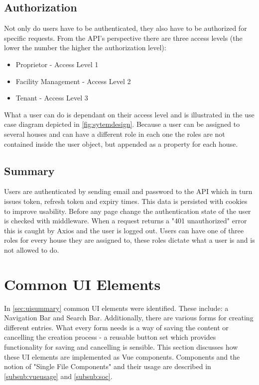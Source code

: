 \subsection{Authorization}
Not only do users have to be authenticated, they also have to be authorized for specific requests. From the API's perspective there are three access levels (the lower the number the higher the authorization level): 

\begin{itemize}
  \item Proprietor - Access Level 1
  \item Facility Management - Access Level 2
  \item Tenant - Access Level 3
\end{itemize}

What a user can do is dependant on their access level and is illustrated in the use case diagram depicted in \autoref{fig:sytemdesign}.
Because a user can be assigned to several houses and can have a different role in each one the roles are not contained inside the user object, but appended as a property for each house.

\subsection{Summary}
Users are authenticated by sending email and password to the API which in turn issues token, refresh token and expiry times. This data is persisted with cookies to improve usability. Before any page change the authentication state of the user is checked with middleware. When a request returns a "401 unauthorized" error this is caught by Axios and the user is logged out. Users can have one of three roles for every house they are assigned to, these roles dictate what a user is and is not allowed to do.

\section{Common UI Elements}
In \autoref{sec:uisummary} common UI elements were identified. These include: a Navigation Bar and Search Bar. Additionally, there are various forms for creating different entries. What every form needs is a way of saving the content or cancelling the creation process - a reusable button set which provides functionality for saving and cancelling is sensible. This section discusses how these UI elements are implemented as Vue components. Components and the notion of "Single File Components" and their usage are described in \autoref{subsub:vueusage} and \autoref{subsub:soc}.

